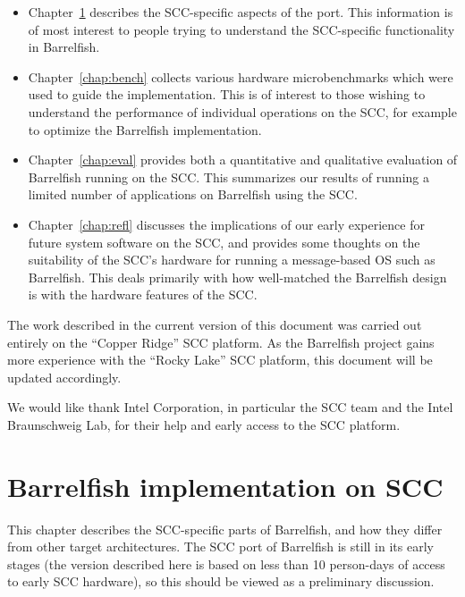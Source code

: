 \documentclass[a4paper,twoside]{report} %
\begin{document}
\begin{itemize}

\item Chapter~\ref{chap:impl} describes the SCC-specific aspects of the
port. This information is of most interest to people trying to
understand the SCC-specific functionality in Barrelfish. 

\item Chapter~\ref{chap:bench} collects various hardware
  microbenchmarks which were used to guide the implementation.  This
  is of interest to those wishing to understand the performance of
  individual operations on the SCC, for example to optimize the 
  Barrelfish implementation. 

\item Chapter~\ref{chap:eval} provides both a quantitative and
  qualitative evaluation of Barrelfish running on the SCC.  This
  summarizes our results of running a limited number of applications
  on Barrelfish using the SCC. 

\item Chapter~\ref{chap:refl} discusses the implications of our early
  experience for future system software on the SCC, and provides some
  thoughts on the suitability of the SCC's hardware for running a
  message-based OS such as Barrelfish.  This deals primarily with how
  well-matched the Barrelfish design is with the hardware features of
  the SCC. 
\end{itemize}

The work described in the current version of this document was carried
out entirely on the ``Copper Ridge'' SCC platform.  
As the Barrelfish project gains more experience with the ``Rocky
Lake'' SCC platform, this document will be updated accordingly. 

We would like
thank Intel Corporation, in particular the SCC team and the Intel
Braunschweig Lab, for their help and early access to the SCC
platform. 


\chapter{Barrelfish implementation on SCC}\label{chap:impl}

This chapter describes the SCC-specific parts of Barrelfish, and how
they differ from other target architectures.   The SCC port of
Barrelfish is still in its early stages (the version described here is
based on less than 10 person-days of access to early SCC hardware), so
this should be viewed as a preliminary discussion.  
\end{document}
